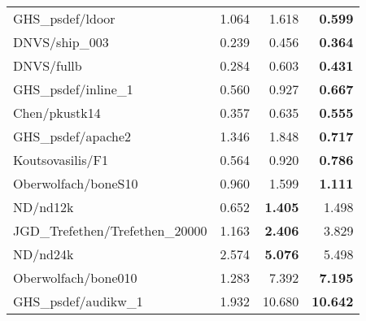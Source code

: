 \begin{tabular}{l|rr|r}
  GHS\_psdef/ldoor                & 1.064                     & 1.618     & \bf 0.599  \\
  DNVS/ship\_003                  & 0.239                     & 0.456     & \bf 0.364  \\
  DNVS/fullb                      & 0.284                     & 0.603     & \bf 0.431  \\
  GHS\_psdef/inline\_1            & 0.560                     & 0.927     & \bf 0.667  \\
  Chen/pkustk14                   & 0.357                     & 0.635     & \bf 0.555  \\
  GHS\_psdef/apache2              & 1.346                     & 1.848     & \bf 0.717  \\
  Koutsovasilis/F1                & 0.564                     & 0.920     & \bf 0.786  \\
  Oberwolfach/boneS10             & 0.960                     & 1.599     & \bf 1.111  \\
  ND/nd12k                        & 0.652                     & \bf 1.405 & 1.498      \\
  JGD\_Trefethen/Trefethen\_20000 & 1.163                     & \bf 2.406 & 3.829      \\
  ND/nd24k                        & 2.574                     & \bf 5.076 & 5.498      \\
  Oberwolfach/bone010             & 1.283                     & 7.392     & \bf 7.195  \\
  GHS\_psdef/audikw\_1            & 1.932                     & 10.680    & \bf 10.642 \\
  \hline
\end{tabular}
